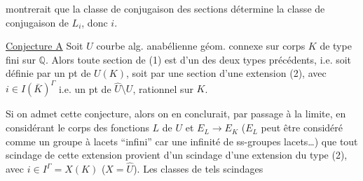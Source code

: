 montrerait que la classe de conjugaison des sections détermine la classe de conjugaison de $L_i$, donc $i$.

\uline{Conjecture A} Soit $U$ courbe alg. anabélienne géom. connexe sur corps $K$ de type fini sur $\mathbb{Q}$. Alors toute section de (1) est  d'un des deux types précédents, i.e. soit définie par un pt de $U(K)$, soit par une section d'une extension (2), avec $i\in I(\bar K)^\Gamma$ i.e. un pt de $\widehat U\setminus U$, rationnel sur $K$.

Si on admet cette conjecture, alors on en conclurait, par passage à la limite, en considérant le corps des fonctions $L$ de $U$ et $E_L\longrightarrow E_K$ ($E_L$ peut être considéré comme un groupe à lacets ``infini'' car une infinité de  ss-groupes lacets\ldots) que tout scindage de cette extension provient d'un scindage d'une extension du type (2), avec $i\in I^\Gamma=X(K)$ ($X=\widehat U$). Les classes de tels scindages
